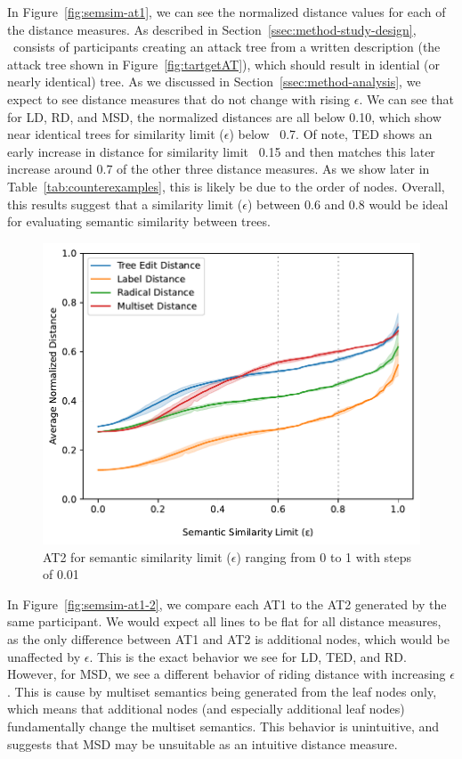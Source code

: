 In Figure~\ref{fig:semsim-at1}, we can see the normalized distance values for each of the distance measures. As described in Section~\ref{ssec:method-study-design}, \ATone\ consists of participants creating an attack tree from a written description (the attack tree shown in Figure~\ref{fig:tartgetAT}), which should result in idential (or nearly identical) tree. As we discussed in Section~\ref{ssec:method-analysis}, we expect to see distance measures that do not change with rising $\epsilon$. We can see that for LD, RD, and MSD, the normalized distances are all below 0.10, which show near identical trees for similarity limit ($\epsilon$) below ~0.7. Of note, TED shows an early increase in distance for similarity limit ~0.15 and then matches this later increase around 0.7 of the other three distance measures. As we show later in Table~\ref{tab:counterexamples}, this is likely be due to the order of nodes. Overall, this results suggest that a similarity limit ($\epsilon$) between 0.6 and 0.8 would be ideal for evaluating semantic similarity between trees.

\begin{figure}
    \includegraphics[width=\linewidth]{code/img/similaritylimits_at2_percentage.pdf}
    \caption{AT2 for semantic similarity limit ($\epsilon$) ranging from 0 to 1 with steps of 0.01}
    \label{fig:semsim-at2}
\end{figure}

In Figure~\ref{fig:semsim-at1-2}, we compare each AT1 to the AT2 generated by the same participant. We would expect all lines to be flat for all distance measures, as the only difference between AT1 and AT2 is additional nodes, which would be unaffected by $\epsilon$. This is the exact behavior we see for LD, TED, and RD. However, for MSD, we see a different behavior of riding distance with increasing $\epsilon$. This is cause by multiset semantics being generated from the leaf nodes only, which means that additional nodes (and especially additional leaf nodes) fundamentally change the multiset semantics. This behavior is unintuitive, and suggests that MSD may be unsuitable as an intuitive distance measure.



